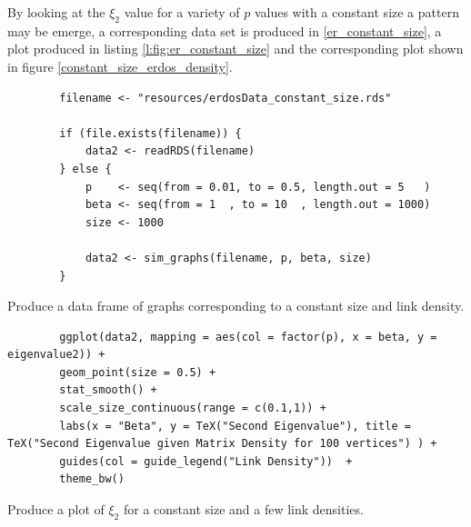 \documentclass[11pt]{report}
\begin{document}
By looking at the \(\xi_{2}\) value for a variety of \(p\) values with a
constant size a pattern may be emerge, a corresponding data set is produced in
\ref{er_constant_size}, a plot produced in listing \ref{l:fig:er_constant_size} and the
corresponding plot shown in figure \ref{constant_size_erdos_density}.

\begin{listing}[htbp]
    \begin{tcolorbox}
        \begin{verbatim}
        filename <- "resources/erdosData_constant_size.rds"

        if (file.exists(filename)) {
            data2 <- readRDS(filename)
        } else {
            p    <- seq(from = 0.01, to = 0.5, length.out = 5   )
            beta <- seq(from = 1  , to = 10  , length.out = 1000)
            size <- 1000

            data2 <- sim_graphs(filename, p, beta, size)
        }
        \end{verbatim}
    \end{tcolorbox}
\caption{\label{er_constant_size}Produce a data frame of graphs corresponding to a constant size and link density.}
\end{listing}

\begin{listing}[htbp]
    \begin{tcolorbox}
        \begin{verbatim}
        ggplot(data2, mapping = aes(col = factor(p), x = beta, y = eigenvalue2)) +
        geom_point(size = 0.5) +
        stat_smooth() +
        scale_size_continuous(range = c(0.1,1)) +
        labs(x = "Beta", y = TeX("Second Eigenvalue"), title = TeX("Second Eigenvalue given Matrix Density for 100 vertices") ) +
        guides(col = guide_legend("Link Density"))  +
        theme_bw()
        \end{verbatim}
    \end{tcolorbox}
\caption{\label{l:fig:er_constant_size}Produce a plot of \(\xi_{2}\) for a constant size and a few link densities.}
\end{listing}
\end{document}

